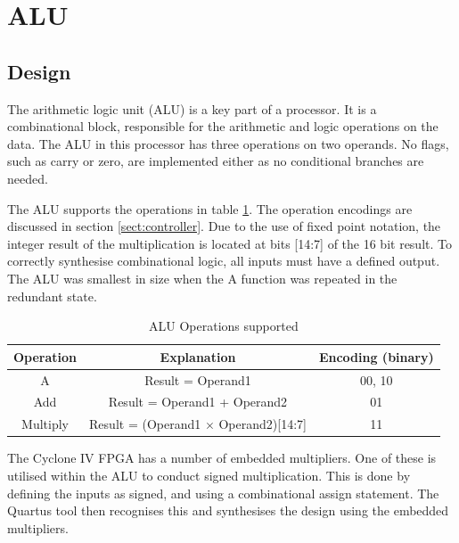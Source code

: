

\section{ALU}

\subsection{Design}
The arithmetic logic unit (ALU) is a key part of a processor. 
It is a combinational block, responsible for the arithmetic and logic operations on the data.
The ALU in this processor has three operations on two operands.
No flags, such as carry or zero, are implemented either as no conditional branches are needed.

The ALU supports the operations in table \ref{tab:aluops}.
The operation encodings are discussed in section \ref{sect:controller}.
Due to the use of fixed point notation, the integer result of the multiplication is located at bits [14:7] of the 16 bit result.
To correctly synthesise combinational logic, all inputs must have a defined output.
The ALU was smallest in size when the A function was repeated in the redundant state.

\begin{table}
\caption{ALU Operations supported}
\label{tab:aluops}
\begin{tabular}{|c|c|c|} \hline
Operation & Explanation & Encoding (binary)\\  \hline
A & Result = Operand1 & 00, 10 \\
Add & Result = Operand1 + Operand2 & 01 \\
Multiply & Result = (Operand1 $\times$ Operand2)[14:7] & 11 \\ \hline
\end{tabular}
\end{table}


The Cyclone IV FPGA has a number of embedded multipliers. 
One of these is utilised within the ALU to conduct signed multiplication. 
This is done by defining the inputs as signed, and using a combinational assign statement.
The Quartus tool then recognises this and synthesises the design using the embedded multipliers.



